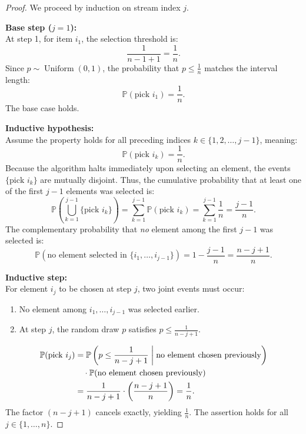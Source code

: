 \begin{proof}
We proceed by induction on stream index $j$.

\textbf{Base step ($j = 1$):}\\
At step 1, for item $i_1$, the selection threshold is:
\begin{equation}
  \frac{1}{n - 1 + 1} = \frac{1}{n}.
\end{equation}
Since $p \sim \operatorname{Uniform}(0, 1)$, the probability that $p \le \frac{1}{n}$ matches the interval length:
\begin{equation}
  \mathbb{P}(\text{pick } i_1) = \frac{1}{n}.
\end{equation}
The base case holds.

\textbf{Inductive hypothesis:}\\
Assume the property holds for all preceding indices $k \in \{1, 2, \dots, j - 1\}$, meaning:
\begin{equation}
  \mathbb{P}(\text{pick } i_k) = \frac{1}{n}.
\end{equation}
Because the algorithm halts immediately upon selecting an element, the events $\{\text{pick } i_k\}$ are mutually disjoint. Thus, the cumulative probability that at least one of the first $j - 1$ elements was selected is:
\begin{equation}
  \mathbb{P}\left(\bigcup_{k=1}^{j-1} \{\text{pick } i_k\}\right) = \sum_{k=1}^{j-1} \mathbb{P}(\text{pick } i_k) = \sum_{k=1}^{j-1} \frac{1}{n} = \frac{j - 1}{n}.
\end{equation}
The complementary probability that \emph{no} element among the first $j - 1$ was selected is:
\begin{equation}
  \mathbb{P}(\text{no element selected in } \{i_1, \dots, i_{j-1}\}) = 1 - \frac{j - 1}{n} = \frac{n - j + 1}{n}.
  \label{eq:prob-none-selected-before}
\end{equation}

\textbf{Inductive step:}\\
For element $i_j$ to be chosen at step $j$, two joint events must occur:
\begin{enumerate}
  \item No element among $i_1, \dots, i_{j-1}$ was selected earlier.
  \item At step $j$, the random draw $p$ satisfies $p \le \frac{1}{n - j + 1}$.
\end{enumerate}
\begin{align}
  \mathbb{P}(\text{pick } i_j) &= \mathbb{P}\left(p \le \frac{1}{n - j + 1} \;\middle|\; \text{no element chosen previously}\right) \notag\\
  &\quad \cdot \mathbb{P}(\text{no element chosen previously}) \notag\\
  &= \frac{1}{n - j + 1} \cdot \left(\frac{n - j + 1}{n}\right) = \frac{1}{n}.
\end{align}
The factor $(n - j + 1)$ cancels exactly, yielding $\frac{1}{n}$. The assertion holds for all $j \in \{1, \dots, n\}$.
\end{proof}

